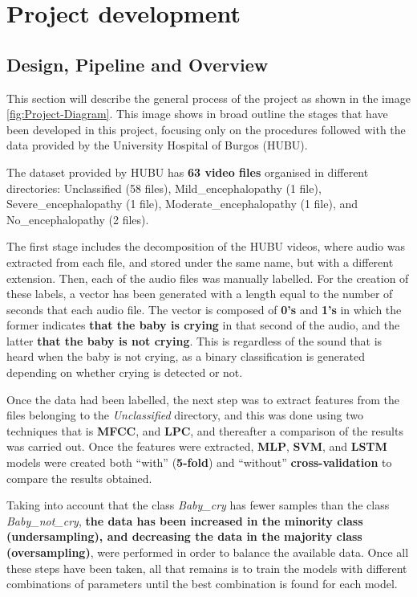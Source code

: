 %
\chapter{Project development}
\label{ch::chapter5}

\section{Design, Pipeline and Overview}
This section will describe the general process of the project as shown in the image \ref{fig:Project-Diagram}. This image shows in broad outline the stages that have been developed in this project, focusing only on the procedures followed with the data provided by the University Hospital of Burgos (HUBU).

\begin{tcolorbox}
The dataset provided by HUBU has \textbf{63 video files} organised in different directories: Unclassified (58 files), Mild\_encephalopathy (1 file), Severe\_encephalopathy (1 file), Moderate\_encephalopathy (1 file), and No\_encephalopathy  (2 files).
\end{tcolorbox}


The first stage includes the decomposition of the HUBU videos, where audio was extracted from each file, and stored under the same name, but with a different extension. Then, each of the audio files was manually labelled. For the creation of these labels, a vector has been generated with a length equal to the number of seconds that each audio file. The vector is composed of \textbf{0’s} and \textbf{1’s} in which the former indicates \textbf{that the baby is crying} in that second of the audio, and the latter \textbf{that the baby is not crying}. This is regardless of the sound that is heard when the baby is not crying, as a binary classification is generated depending on whether crying is detected or not. 

Once the data had been labelled, the next step was to extract features from the files belonging to the \textit{Unclassified} directory, and this was done using two techniques that is \textbf{MFCC}, and \textbf{LPC}, and thereafter a comparison of the results was carried out. Once the features were extracted, \textbf{MLP}, \textbf{SVM}, and \textbf{LSTM} models were created both “with” (\textbf{5-fold}) and “without” \textbf{cross-validation} to compare the results obtained. 

Taking into account that the class \textit{Baby\_cry} has fewer samples than the class \textit{Baby\_not\_cry}, \textbf{the data has been increased in the minority class (undersampling), and decreasing the data in the majority class (oversampling)}, were performed in order to balance the available data. Once all these steps have been taken, all that remains is to train the models with different combinations of parameters until the best combination is found for each model.

